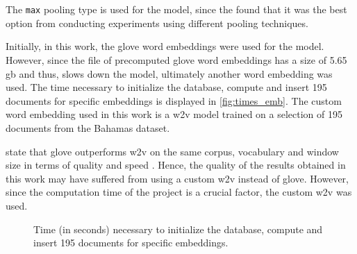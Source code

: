 \section{\infersent{}}\label{sec:evaluation-inferSent}

The \texttt{max} pooling type is used for the \infersent{} model, since the \citeauthor{inferSent2018} 
found that it was the best option from conducting experiments using different pooling techniques.

Initially, in this work, the \ac{glove} word embeddings were used for the \infersent{} model.
However, since the file of precomputed \acs{glove} word embeddings has a size of 5.65 \ac{gb} and thus,
slows down the model, ultimately another word embedding was used.
The time necessary to initialize the database, compute and insert 195 documents for specific embeddings is displayed in \autoref{fig:times_emb}.
The custom word embedding used in this work is a \ac{w2v} model trained on a selection of 195 documents from the Bahamas dataset.

\citeauthor{glove2014} state that \acs{glove} outperforms \ac{w2v} on the same corpus, 
vocabulary and window size in terms of quality and speed \cite{glove2014}.
Hence, the quality of the results obtained in this work may have suffered from using a custom \ac{w2v} instead of \acs{glove}.
However, since the computation time of the project is a crucial factor, the custom \ac{w2v} was used.

\begin{figure}%
    \centering
    \qquad
    \caption{Time (in seconds) necessary to initialize the database, compute and insert 195 documents for specific embeddings.}%
    \label{fig:times_emb}%
\end{figure}
